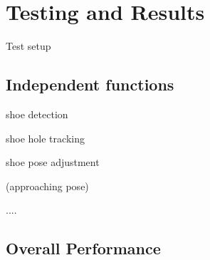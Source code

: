 \chapter{Testing and Results}

Test setup

\section{Independent functions}

shoe detection

shoe hole tracking 

shoe pose adjustment

(approaching pose)

....

\section{Overall Performance}
